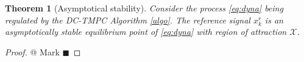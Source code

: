 \documentclass[letterpaper, 10 pt, conference]{ieeeconf}
\newtheorem{theorem}{Theorem}
\begin{document}
\begin{theorem}[Asymptotical stability] Consider the process \eqref{eq:dyna} being regulated by the DC-TMPC Algorithm \ref{algo}. The reference signal $x^r_k$ is an asymptotically stable equilibrium point of \eqref{eq:dyna} with region of attraction $\mathcal{X}$.  
\end{theorem}
\begin{proof}
@ Mark $\blacksquare$

\end{proof}
\end{document}
